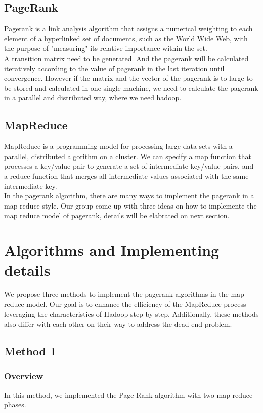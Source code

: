 \documentclass[a4paper]{article}
\begin{document}
\subsection{PageRank}
Pagerank is a link analysis algorithm that assigns a numerical weighting to each element of a hyperlinked set of documents, such as the World Wide Web, with the purpose of "measuring" its relative importance within the set.\\

A transition matrix need to be generated. And the pagerank will be calculated iteratively according to the value of pagerank in the last iteration until convergence. However if the matrix and the vector of the pagerank is to large to be stored and calculated in one single machine, we need to calculate the pagerank in a parallel and distributed way, where we need hadoop.

\subsection{MapReduce}
MapReduce is a programming model for processing large data sets with a parallel, distributed algorithm on a cluster. We can specify a map function that processes a key/value pair to generate a set of intermediate key/value pairs, and a reduce function that merges all intermediate values associated with the same intermediate key. \\

In the pagerank algorithm, there are many ways to implement the pagerank in a map reduce style. Our group come up with three ideas on how to implemente the map reduce model of pagerank, details will be elabrated on next section.

\section{Algorithms and Implementing details}
We propose three methods to implement the pagerank algorithms in the map reduce model. Our goal is to enhance the efficiency of the MapReduce process leveraging the characteristics of Hadoop step by step. Additionally, these methods also differ with each other on their way to address the dead end problem.

\subsection{Method 1}

\subsubsection{Overview}
In this method, we implemented the Page-Rank algorithm with two map-reduce phases. \\
\end{document}
